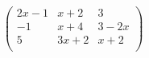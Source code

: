 \documentclass[printbox]{BHCexam}
\begin{document}

   

  
   


      $\left(                 %
        \begin{array}{ccc}   %
          2x-1 & x+2 & 3\\  %
          -1 & x+4 & 3-2x\\  %
          5 & 3x+2 & x+2\\ 
        \end{array}
      \right)$                 %
\end{document}
